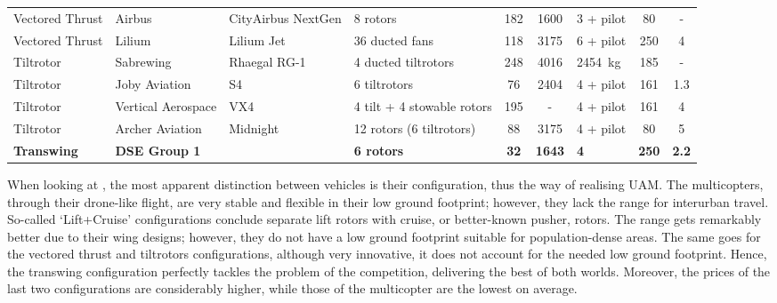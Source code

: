 \begin{table}[H]
{\begin{tabular}{llllS[table-format=3]S[table-format=4]lS[table-format=3]S[table-format=1.2]}
            Vectored Thrust        & Airbus                & CityAirbus NextGen & 8 rotors                   & 182         & 1600                   & 3 + pilot                  & 80                      & {-}                        \\
            Vectored Thrust        & Lilium                & Lilium Jet         & 36 ducted fans             & 118           & 3175                  & 6 + pilot               & 250                     & 4                 \\
            Tiltrotor              & Sabrewing             & Rhaegal RG-1       & 4 ducted tiltrotors        & 248             & 4016                  & \qty{2454}{\kg}            & 185                    & {-}                        \\
            Tiltrotor              & Joby Aviation         & S4                 & 6 tiltrotors               & 76            & 2404                  & 4 + pilot        & 161                     & 1.3               \\
            Tiltrotor              & Vertical Aerospace    & VX4                & 4 tilt + 4 stowable rotors & 195          & {-}                      & 4 + pilot               & 161                     & 4                 \\
            Tiltrotor              & Archer Aviation       & Midnight           & 12 rotors (6 tiltrotors)   & 88                     & 3175                  & 4 + pilot               & 80                   & 5       \\ \midrule
            \textbf{Transwing}     & \textbf{DSE Group 1}  &      & \textbf{6 rotors}          & \textbf{32} & \textbf{1643} & \textbf{4} & \textbf{250} & \textbf{2.2} \\
            \bottomrule
        \end{tabular}
    }
\end{table}


When looking at , the most apparent distinction between vehicles is their configuration, thus the way of realising UAM.
The multicopters, through their drone-like flight, are very stable and flexible in their low ground footprint; however, they lack the range for interurban travel.
So-called \enquote*{Lift+Cruise} configurations conclude separate lift rotors with cruise, or better-known pusher, rotors.
The range gets remarkably better due to their wing designs; however, they do not have a low ground footprint suitable for population-dense areas.
The same goes for the vectored thrust and tiltrotors configurations, although very innovative, it does not account for the needed low ground footprint.
Hence, the transwing configuration perfectly tackles the problem of the competition, delivering the best of both worlds.
Moreover, the prices of the last two configurations are considerably higher, while those of the multicopter are the lowest on average.

